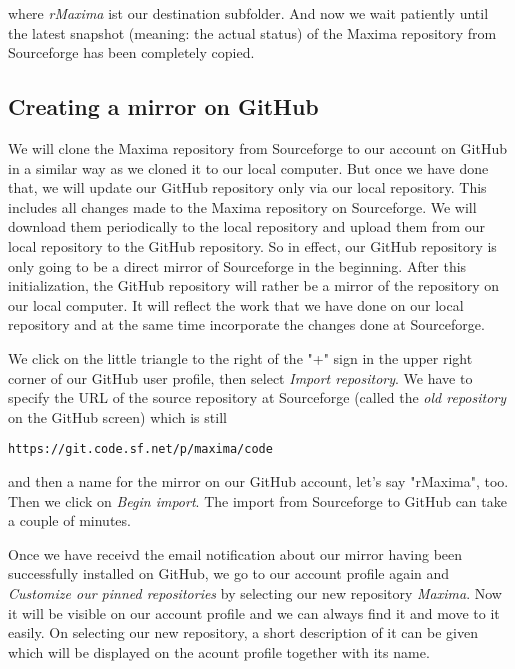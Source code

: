 \documentclass[../Maxima_Workbook.tex]{subfiles}
\begin{document}
where \emph{rMaxima} ist our destination subfolder. And now we wait patiently until the latest snapshot (meaning: the actual status) of the Maxima repository from Sourceforge has been completely copied.

\subsection{Creating a mirror on GitHub}

We will clone the Maxima repository from Sourceforge to our account on GitHub in a similar way as we cloned it to our local computer. But once we have done that, we will update our GitHub repository only via our local repository. This includes all changes made to the Maxima repository on Sourceforge. We will download them periodically to the local repository and upload them from our local repository to the GitHub repository. So in effect, our GitHub repository is only going to be a direct mirror of Sourceforge in the beginning. After this initialization, the GitHub repository will rather be a mirror of the repository on our local computer. It will reflect the work that we have done on our local repository and at the same time incorporate the changes done at Sourceforge.

\lz We click on the little triangle to the right of the "+" sign in the upper right corner of our GitHub user profile, then select \emph{Import repository}. We have to specify the URL of the source repository at Sourceforge (called the \emph{old repository} on the GitHub screen) which is still 

\begin{lstlisting}[style=smallblue]
https://git.code.sf.net/p/maxima/code
\end{lstlisting}

and then a name for the mirror on our GitHub account, let's say "rMaxima", too. Then we click on \emph{Begin import}. The import from Sourceforge to GitHub can take a couple of minutes.

\lz Once we have receivd the email notification about our mirror having been successfully installed on GitHub, we go to our account profile again and \emph{Customize our pinned repositories} by selecting our new repository \emph{Maxima}. Now it will be visible on our account profile and we can always find it and move to it easily. On selecting our new repository, a short description of it can be given which will be displayed on the acount profile together with its name.
\end{document}
